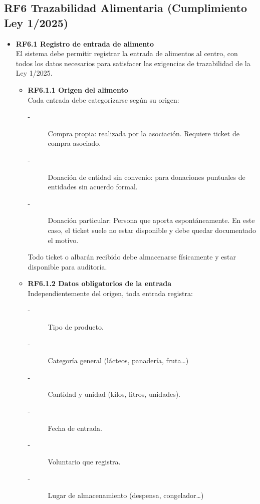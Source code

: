 \subsection{RF6 Trazabilidad Alimentaria (Cumplimiento Ley 1/2025)}
\begin{itemize}
    \item \textbf{RF6.1 Registro de entrada de alimento} \\
    El sistema debe permitir registrar la entrada de alimentos al centro,
    con todos los datos necesarios para satisfacer las exigencias de
    trazabilidad de la Ley 1/2025.
    \begin{itemize}
        \item \textbf{RF6.1.1 Origen del alimento} \\
        Cada entrada debe categorizarse según su origen:
        \begin{description}
            \item[-] Compra propia: realizada por la asociación. Requiere ticket de compra asociado.
            \item[-] Donación de entidad sin convenio: para donaciones puntuales de entidades sin acuerdo formal.
            \item[-] Donación particular: Persona que aporta espontáneamente. En este caso, el ticket suele no estar disponible y debe quedar documentado el motivo.
        \end{description}
        \par 
        Todo ticket o albarán recibido debe almacenarse físicamente y estar disponible para auditoría.
        \item \textbf{RF6.1.2 Datos obligatorios de la entrada} \\
        Independientemente del origen, toda entrada registra: 
        \begin{description}
            \item[-] Tipo de producto.
            \item[-] Categoría general (lácteos, panadería, fruta\ldots)
            \item[-] Cantidad y unidad (kilos, litros, unidades).
            \item[-] Fecha de entrada.
            \item[-] Voluntario que registra.
            \item[-] Lugar de almacenamiento (despensa, congelador\ldots)

\end{description}
\end{itemize}
\end{itemize}
